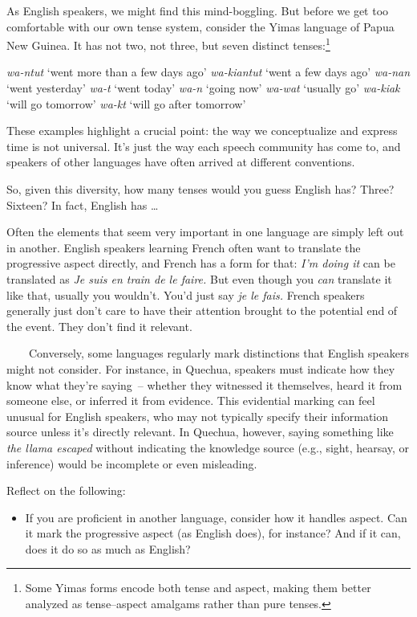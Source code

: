 As English speakers, we might find this mind-boggling. But before we get too comfortable with our own tense system, consider the Yimas language of Papua New Guinea. It has not two, not three, but seven distinct tenses:\footnote{Some Yimas forms encode both tense and aspect, making them better analyzed as tense--aspect amalgams rather than pure tenses.}

\ea
\ea \textit{wa-ntut} \hfill`went more than a few days ago'
\ex \textit{wa-kiantut} \hfill`went a few days ago'
\ex \textit{wa-nan} \hfill`went yesterday'
\ex \textit{wa-t} \hfill`went today'
\ex \textit{wa-n} \hfill`going now'
\ex \textit{wa-wat} \hfill`usually go'
\ex \textit{wa-kiak} \hfill`will go tomorrow'
\ex \textit{wa-kt} \hfill`will go after tomorrow'
\z\z

These examples highlight a crucial point: the way we conceptualize and express time is not universal. It's just the way each speech community has come to, and speakers of other languages have often arrived at different conventions.

So, given this diversity, how many tenses would you guess English has? Three? Sixteen? In fact, English has \dots

\begin{tcolorbox}[title=Exercise: Comparing Tense and Aspect Across Languages, colback=white, colframe=blue!75!black, fonttitle=\bfseries]

Often the elements that seem very important in one language are simply left out in another. English speakers learning French often want to translate the progressive aspect directly, and French has a form for that: \textit{I'm doing it} can be translated as \textit{Je suis en train de le faire.} But even though you \textit{can} translate it like that, usually you wouldn't. You'd just say \textit{je le fais.} French speakers generally just don't care to have their attention brought to the potential end of the event. They don't find it relevant.

~~~~Conversely, some languages regularly mark distinctions that English speakers might not consider. For instance, in Quechua, speakers must indicate how they know what they're saying~-- whether they witnessed it themselves, heard it from someone else, or inferred it from evidence. This evidential marking can feel unusual for English speakers, who may not typically specify their information source unless it's directly relevant. In Quechua, however, saying something like \textit{the llama escaped} without indicating the knowledge source (e.g., sight, hearsay, or inference) would be incomplete or even misleading.

Reflect on the following:
\begin{itemize}[nosep]
    \item If you are proficient in another language, consider how it handles aspect. Can it mark the progressive aspect (as English does), for instance? And if it can, does it do so as much as English?
\end{itemize}

\end{tcolorbox}

